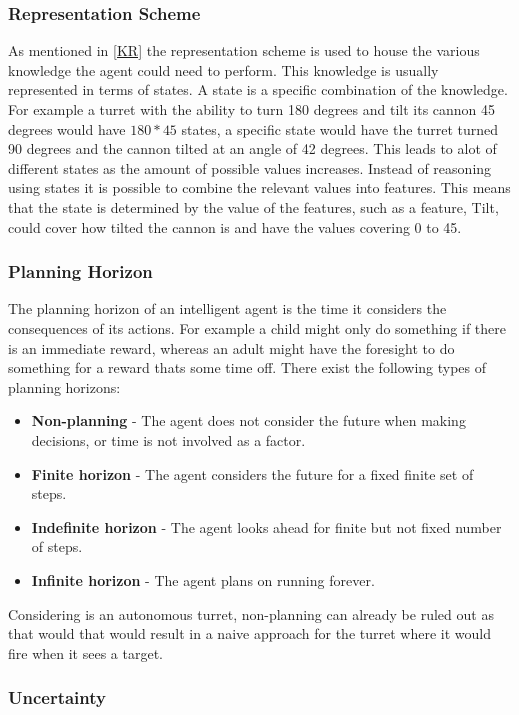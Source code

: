 \subsubsection{Representation Scheme}
As mentioned in \autoref{KR} the representation scheme is used to house the
various knowledge the agent could need to perform. This knowledge is usually
represented in terms of states. A state is a specific combination of
the knowledge. For example a turret with the ability to turn 180 degrees and
tilt its cannon 45 degrees would have $180 * 45$ states, a specific state
would have the turret turned 90 degrees and the cannon tilted at an angle of 42
degrees. This leads to alot of different states as the amount of possible values
increases. Instead of reasoning using states it is possible to combine the
relevant values into features. This means that the state is determined by the
value of the features, such as a feature, Tilt, could cover how tilted the
cannon is and have the values covering 0 to 45.

\subsubsection{Planning Horizon}
The planning horizon of an intelligent agent is the time it considers the
consequences of its actions. For example a child might only do something if
there is an immediate reward, whereas an adult might have the foresight to do
something for a reward thats some time off. There exist the following types of planning
horizons:
\begin{itemize}
	\item \textbf{Non-planning} - The agent does not consider the future when
	making decisions, or time is not involved as a factor.
	\item \textbf{Finite horizon} - The agent considers the future for a fixed
	finite set of steps. 
	\item \textbf{Indefinite horizon} - The agent looks ahead for finite but not
	fixed number of steps.
	\item \textbf{Infinite horizon} - The agent plans on running forever.	
\end{itemize}

Considering \name is an autonomous turret, non-planning can already be ruled
out as that would that would result in a naive approach for the turret where it
would fire when it sees a target.

\subsubsection{Uncertainty}

